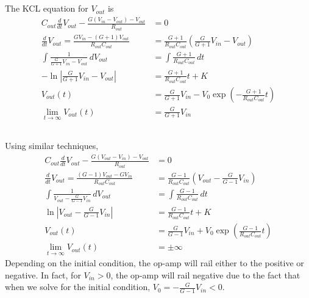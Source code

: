 \documentclass[]{article}
\newcommand{\diff}[1]{\frac{d}{d #1}}
\begin{document}
\subsection{}

The KCL equation for \(V_{out}\) is
\begin{align}
	C_{out} \diff{t} V_{out} - \frac{G (V_{in} - V_{out}) - V_{out}}{R_{out}} &= 0 \\
	\diff{t} V_{out} = \frac{G V_{in} - (G + 1) V_{out}}{R_{out} C_{out}} &= \frac{G + 1}{R_{out} C_{out}} \left(\frac{G}{G + 1} V_{in} - V_{out}\right) \\
	\int \frac{1}{\frac{G}{G + 1} V_{in} - V_{out}} \, dV_{out} &= \int \frac{G + 1}{R_{out} C_{out}} \, dt \\
	-\ln\left|\frac{G}{G + 1} V_{in} - V_{out}\right| &= \frac{G + 1}{R_{out} C_{out}} t + K \\
	V_{out}(t) &= \frac{G}{G + 1} V_{in} - V_0 \exp\left(-\frac{G + 1}{R_{out} C_{out}} t\right) \\
	\lim_{t \to \infty} V_{out}(t) &= \frac{G}{G + 1} V_{in}
\end{align}

\subsection{}

Using similar techniques,
\begin{align}
	C_{out} \diff{t} V_{out} - \frac{G (V_{out} - V_{in}) - V_{out}}{R_{out}} &= 0 \\
	\diff{t} V_{out} = \frac{(G - 1) V_{out} - G V_{in}}{R_{out} C_{out}} &= \frac{G - 1}{R_{out} C_{out}} \left(V_{out} - \frac{G}{G - 1} V_{in}\right) \\
	\int \frac{1}{V_{out} - \frac{G}{G - 1} V_{in}} \, dV_{out} &= \int \frac{G - 1}{R_{out} C_{out}} \, dt \\
	\ln\left|V_{out} - \frac{G}{G - 1} V_{in}\right| &= \frac{G - 1}{R_{out} C_{out}} t + K \\
	V_{out}(t) &= \frac{G}{G - 1} V_{in} + V_0 \exp\left(\frac{G - 1}{R_{out} C_{out}} t\right) \\
	\lim_{t \to \infty} V_{out}(t) &= \pm \infty
\end{align}
Depending on the initial condition, the op-amp will rail either to the positive or negative.
In fact, for \(V_{in} > 0\), the op-amp will rail negative due to the fact that when we solve for the initial condition, \(V_0 = -\frac{G}{G - 1} V_{in} < 0\).
\end{document}

